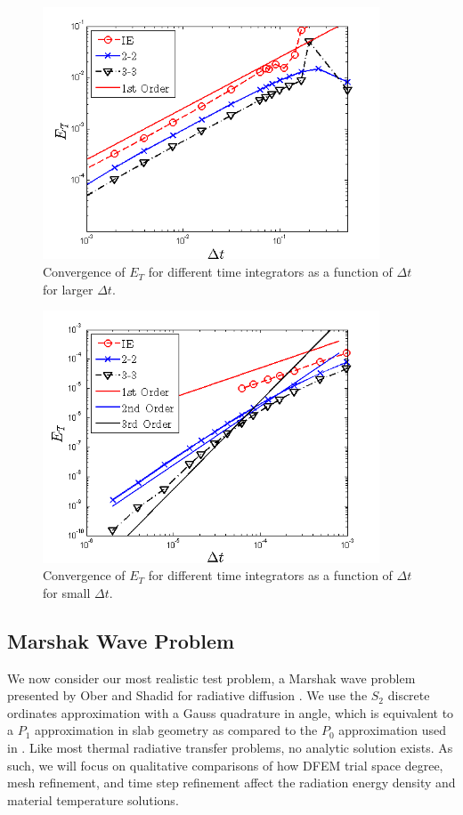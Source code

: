 \begin{figure}[!htp]
\centering
\includegraphics[width=10cm]{chapter6_grey_radtran/Extended_Time_Integrators_Convergence_Temperature_Big_dt.png}
\caption{Convergence of $E_{T}$ for different time integrators as a function of $\Delta t$ for larger $\Delta t$.}
\label{fig:big_dt}
\end{figure}
\begin{figure}[!htp]
\centering
\includegraphics[width=10cm]{chapter6_grey_radtran/Extended_Time_Integrators_Convergence_Temperature_Small_dt.png}
\caption{Convergence of $E_{T}$ for different time integrators as a function of $\Delta t$ for small $\Delta t$.}
\label{fig:small_dt}
\end{figure}

\subsection{Marshak Wave Problem}

We now consider our most realistic test problem, a Marshak wave problem presented by Ober and Shadid for radiative diffusion \cite{ober_shadid}.
We use the $S_2$ discrete ordinates approximation with a Gauss quadrature in angle, which is equivalent to a $P_1$ approximation in slab geometry \cite{s2sa} as compared to the $P_0$ approximation used in \cite{ober_shadid}. 
Like most thermal radiative transfer problems, no analytic solution exists.  
As such, we will focus on qualitative comparisons of how DFEM trial space degree, mesh refinement, and time step refinement affect the radiation energy density and material temperature solutions.

